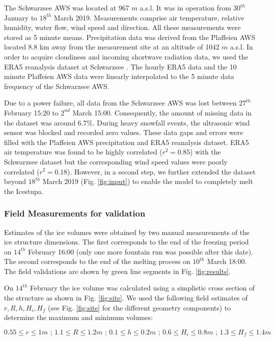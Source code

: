 \documentclass[utf8]{frontiersSCNS} %
\begin{document}
The Schwarzsee AWS was located at 967 $m$ a.s.l. It was in operation from $30^{th}$  January to $18^{th}$ March 2019.
Measurements comprise air temperature, relative humidity, water flow, wind speed and direction. All these measurements
were stored as 5 minute means. Precipitation data was derived from the Plaffeien AWS \citep{meteoswiss} located 8.8 km
away from the measurement site at an altitude of 1042 $m$ a.s.l. In order to acquire cloudiness and incoming shortwave
radiation data, we used the ERA5 reanalysis dataset at Schwarzsee \citep{era5}. The hourly ERA5 data and the 10 minute
Plaffeien AWS data were linearly interpolated to the 5 minute data frequency of the Schwarzsee AWS. 

Due to a power failure, all data from the Schwarzsee AWS was lost between $27^{th}$ February 15:20 to $2^{nd}$ March
15:00. Consequently, the amount of missing data in the dataset was around 6.7\%.  During heavy snowfall events, the
ultrasonic wind sensor was blocked and recorded zero values. These data gaps and errors were filled with the  Plaffeien
AWS precipitation and ERA5 reanalysis dataset. ERA5 air temperature was found to be highly correlated ($r^2 = 0.85$)
with the Schwarzsee dataset but the corresponding wind speed values were poorly correlated ($r^2 = 0.18$). However, in a
second step, we further extended the dataset beyond $18^{th}$ March 2019 (Fig.  \ref{fig:input}) to enable the model to
completely melt the Icestupa.

\subsubsection{Field Measurements for validation} \label{section:validation} Estimates of the ice volumes were obtained
by two manual measurements of the ice structure dimensions. The first corresponds to the end of the freezing period on
$14^{th}$ February 16:00 (only one more fountain run was possible after this date). The second corresponds to the end of
the melting process on $10^{th}$ March 18:00. The field validations are shown by green line segments in Fig.
\ref{fig:results}.

On $14^{th}$ February the ice volume was calculated using a simplistic cross section of the structure as shown in Fig.
\ref{fig:site}. We used the following field estimates of $r, R, h, H_i, H_f$ (see Fig. \ref{fig:site} for the different
geometry components) to determine the maximum and minimum volumes:

\begin{equation} 0.55\leq r\leq 1 m\textit{ ; }1.1\leq R\leq 1.2 m\textit{ ; }0.1\leq h\leq 0.2 m\textit{ ; }0.6\leq
H_i\leq 0.8 m\textit{ ; }1.3\leq H_f\leq 1.4 m \end{equation}
\end{document}
